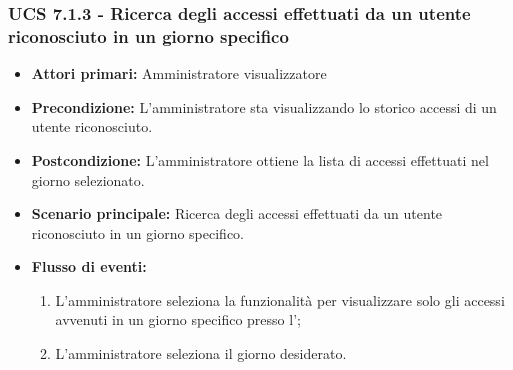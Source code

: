 \subsubsection{UCS 7.1.3 - Ricerca degli accessi effettuati da un utente riconosciuto in un giorno specifico}
\begin{itemize}
	\item \textbf{Attori primari:} Amministratore visualizzatore
	\item \textbf{Precondizione:} L'amministratore sta visualizzando lo storico accessi di un utente riconosciuto.
	\item \textbf{Postcondizione:} L'amministratore ottiene la lista di accessi effettuati nel giorno selezionato.
	\item \textbf{Scenario principale:} Ricerca degli accessi effettuati da un utente riconosciuto in un giorno specifico.
	\item \textbf{Flusso di eventi:}
	\begin{enumerate}
		\item L'amministratore seleziona la funzionalità per visualizzare solo gli accessi avvenuti in un giorno specifico presso l';
		\item L'amministratore seleziona il giorno desiderato.
	\end{enumerate}  
\end{itemize}


